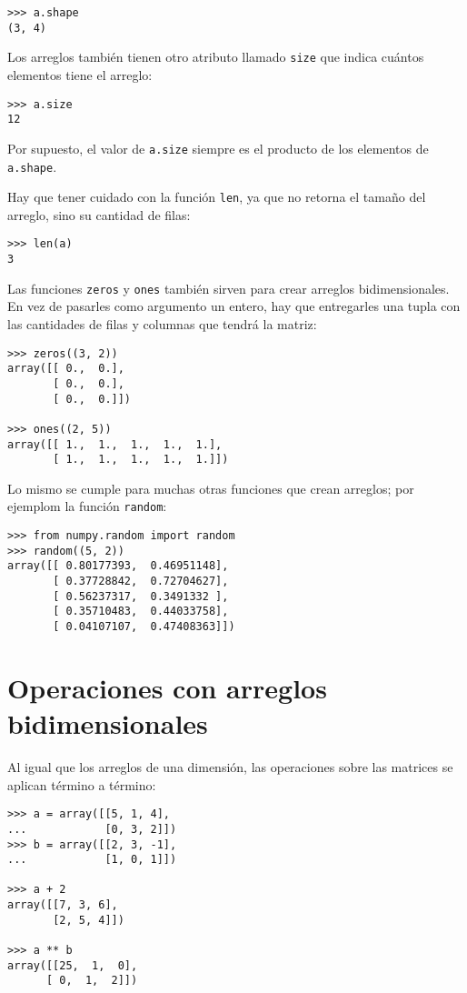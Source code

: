 \begin{lstlisting}
>>> a.shape
(3, 4)
\end{lstlisting}

Los arreglos también tienen otro atributo llamado \lstinline!size! que
indica cuántos elementos tiene el arreglo:

\begin{lstlisting}
>>> a.size
12
\end{lstlisting}

Por supuesto, el valor de \lstinline!a.size! siempre es el producto de
los elementos de \lstinline!a.shape!.

Hay que tener cuidado con la función \lstinline!len!, ya que no retorna
el tamaño del arreglo, sino su cantidad de filas:

\begin{lstlisting}
>>> len(a)
3
\end{lstlisting}

Las funciones \lstinline!zeros! y \lstinline!ones! también sirven para
crear arreglos bidimensionales. En vez de pasarles como argumento un
entero, hay que entregarles una tupla con las cantidades de filas y
columnas que tendrá la matriz:

\begin{lstlisting}
>>> zeros((3, 2))
array([[ 0.,  0.],
       [ 0.,  0.],
       [ 0.,  0.]])

>>> ones((2, 5))
array([[ 1.,  1.,  1.,  1.,  1.],
       [ 1.,  1.,  1.,  1.,  1.]])
\end{lstlisting}

Lo mismo se cumple para muchas otras funciones que crean arreglos; por
ejemplom la función \lstinline!random!:

\begin{lstlisting}
>>> from numpy.random import random
>>> random((5, 2))
array([[ 0.80177393,  0.46951148],
       [ 0.37728842,  0.72704627],
       [ 0.56237317,  0.3491332 ],
       [ 0.35710483,  0.44033758],
       [ 0.04107107,  0.47408363]])
\end{lstlisting}

\section{Operaciones con arreglos bidimensionales}

Al igual que los arreglos de una dimensión, las operaciones sobre las
matrices se aplican término a término:

\begin{lstlisting}
>>> a = array([[5, 1, 4],
...            [0, 3, 2]])
>>> b = array([[2, 3, -1],
...            [1, 0, 1]])

>>> a + 2
array([[7, 3, 6],
       [2, 5, 4]])

>>> a ** b
array([[25,  1,  0],
      [ 0,  1,  2]])
\end{lstlisting}

